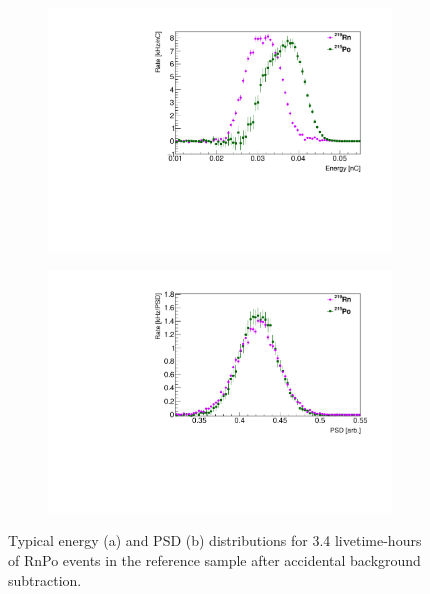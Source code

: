 \begin{figure}[!t]
	\centering
	\begin{subfigure}{0.5\linewidth}
		\centering
		\includegraphics[width=1.\linewidth]{"tex/6-ac227-images/BNL/RnPoEn_TimeBin23_S2"}
		\caption{}
	\end{subfigure}%
	\begin{subfigure}{0.5\linewidth}
		\centering
		\includegraphics[width=1.\linewidth]{"tex/6-ac227-images/BNL/RnPoPSD_TimeBin23_S2"}
		\caption{}
	\end{subfigure}
	\caption{Typical energy (a) and PSD (b) distributions for 3.4 livetime-hours of RnPo events in the reference sample after accidental background subtraction.}
	\label{fig:rnpoenpsd}
\end{figure}

